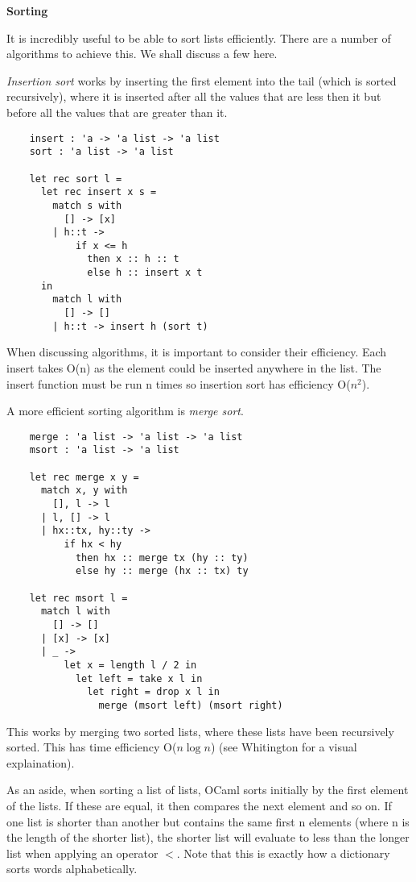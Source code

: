 \documentclass[12pt]{article}
\begin{document}
\begin{center}\LARGE\bf
    Sorting
\end{center}

It is incredibly useful to be able to sort lists efficiently. There are a number of algorithms to achieve
this. We shall discuss a few here.

\textit{Insertion sort} works by inserting the first element into the tail (which is sorted recursively),
where it is inserted after all the values that are less then it but before all the values that are greater
than it.
\begin{lstlisting}
    insert : 'a -> 'a list -> 'a list
    sort : 'a list -> 'a list

    let rec sort l =
      let rec insert x s =
        match s with
          [] -> [x]
        | h::t ->
            if x <= h
              then x :: h :: t
              else h :: insert x t
      in
        match l with
          [] -> []
        | h::t -> insert h (sort t)
\end{lstlisting}
When discussing algorithms, it is important to consider their efficiency. Each insert takes O(n) as the
element could be inserted anywhere in the list. The insert function must be run n times so insertion sort
has efficiency O($n^2$).

A more efficient sorting algorithm is \textit{merge sort}.
\begin{lstlisting}
    merge : 'a list -> 'a list -> 'a list
    msort : 'a list -> 'a list

    let rec merge x y =
      match x, y with
        [], l -> l
      | l, [] -> l
      | hx::tx, hy::ty ->
          if hx < hy
            then hx :: merge tx (hy :: ty)
            else hy :: merge (hx :: tx) ty

    let rec msort l =
      match l with
        [] -> []
      | [x] -> [x]
      | _ ->
          let x = length l / 2 in
            let left = take x l in
              let right = drop x l in
                merge (msort left) (msort right)
\end{lstlisting}
This works by merging two sorted lists, where these lists have been recursively sorted. This has time
efficiency O($n\log n$) (see Whitington for a visual explaination).

As an aside, when sorting a list of lists, OCaml sorts initially by the first element of the lists.
If these are equal, it then compares the next element and so on. If one list is shorter than
another but contains the same first n elements (where n is the length of the shorter list), the
shorter list will evaluate to less than the longer list when applying an operator $<$. Note that this is
exactly how a dictionary sorts words alphabetically.
\end{document}

